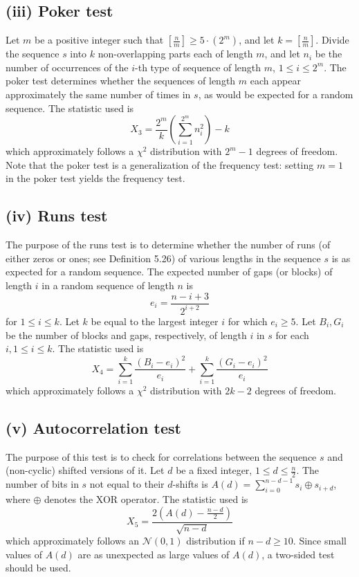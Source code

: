 \documentclass[12pt,openany]{book}
\theoremstyle{definition}
\begin{document}
\subsection*{(iii) Poker test}
Let \( m \) be a positive integer such that \( \left[ \frac{n}{m} \right] \geq 5 \cdot (2^m) \), and let \( k = \left[ \frac{n}{m} \right] \). Divide the sequence \( s \) into \( k \) non-overlapping parts each of length \( m \), and let \( n_i \) be the number of occurrences of the \( i \)-th type of sequence of length \( m \), \( 1 \leq i \leq 2^m \). The poker test determines whether the sequences of length \( m \) each appear approximately the same number of times in \( s \), as would be expected for a random sequence. The statistic used is
\[ X_3 = \frac{2^m}{k} \left( \sum_{i=1}^{2^m} n_i^2 \right) - k \]
which approximately follows a \( \chi^2 \) distribution with \( 2^m - 1 \) degrees of freedom. Note that the poker test is a generalization of the frequency test: setting \( m = 1 \) in the poker test yields the frequency test.

\subsection*{(iv) Runs test}
The purpose of the runs test is to determine whether the number of runs (of either zeros or ones; see Definition 5.26) of various lengths in the sequence \( s \) is as expected for a random sequence. The expected number of gaps (or blocks) of length \( i \) in a random sequence of length \( n \) is
\[ e_i = \frac{n-i+3}{2^{i+2}} \]
for \( 1 \leq i \leq k \). Let \( k \) be equal to the largest integer \( i \) for which \( e_i \geq 5 \). Let \( B_i, G_i \) be the number of blocks and gaps, respectively, of length \( i \) in \( s \) for each \( i, 1 \leq i \leq k \). The statistic used is
\[ X_4 = \sum_{i=1}^{k} \frac{(B_i - e_i)^2}{e_i} + \sum_{i=1}^{k} \frac{(G_i - e_i)^2}{e_i} \]
which approximately follows a \( \chi^2 \) distribution with \( 2k - 2 \) degrees of freedom.

\subsection*{(v) Autocorrelation test}
The purpose of this test is to check for correlations between the sequence \( s \) and (non-cyclic) shifted versions of it. Let \( d \) be a fixed integer, \( 1 \leq d \leq \frac{n}{2} \). The number of bits in \( s \) not equal to their \( d \)-shifts is \( A(d) = \sum_{i=0}^{n-d-1} s_i \oplus s_{i+d} \), where \( \oplus \) denotes the XOR operator. The statistic used is
\[ X_5 = \frac{2(A(d) - \frac{n-d}{2})}{\sqrt{n-d}} \]
which approximately follows an \( \mathcal{N}(0, 1) \) distribution if \( n - d \geq 10 \). Since small values of \( A(d) \) are as unexpected as large values of \( A(d) \), a two-sided test should be used.
\end{document}
